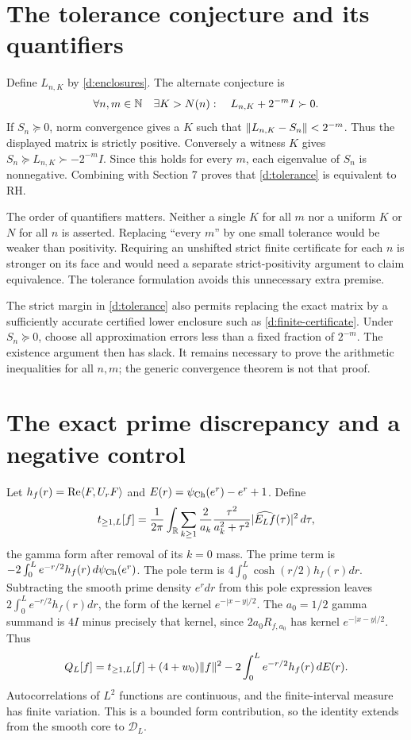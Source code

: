 \section{The tolerance conjecture and its quantifiers}
Define $L_{n,K}$ by \eqref{d:enclosures}. The alternate conjecture is
\begin{equation}\label{d:tolerance}
\forall n,m\in\mathbb N\quad\exists K>N(n):\quad
L_{n,K}+2^{-m}I\succ0.
\end{equation}
If $S_n\succeq0$, norm convergence gives a $K$ such that
$\lVert L_{n,K}-S_n\rVert<2^{-m}$. Thus the displayed matrix is strictly
positive. Conversely a witness $K$ gives
$S_n\succeq L_{n,K}\succ-2^{-m}I$. Since this holds for every $m$,
each eigenvalue of $S_n$ is nonnegative. Combining with Section 7 proves
that \eqref{d:tolerance} is equivalent to RH.

The order of quantifiers matters. Neither a single $K$ for all $m$ nor a
uniform $K$ or $N$ for all $n$ is asserted. Replacing ``every $m$'' by one
small tolerance would be weaker than positivity. Requiring an unshifted
strict finite certificate for each $n$ is stronger on its face and would
need a separate strict-positivity argument to claim equivalence.
The tolerance formulation avoids this unnecessary extra premise.

The strict margin in \eqref{d:tolerance} also permits replacing the exact
matrix by a sufficiently accurate certified lower enclosure such as
\eqref{d:finite-certificate}. Under $S_n\succeq0$, choose all approximation
errors less than a fixed fraction of $2^{-m}$. The existence argument
then has slack. It remains necessary to prove the arithmetic inequalities
for all $n,m$; the generic convergence theorem is not that proof.

\section{The exact prime discrepancy and a negative control}
Let $h_f(r)=\operatorname{Re}\langle F,U_rF\rangle$ and
$E(r)=\psi_{\rm Ch}(e^r)-e^r+1$. Define
\[
t_{\ge1,L}[f]=\frac1{2\pi}\int_\mathbb R
\sum_{k\ge1}\frac2{a_k}\frac{\tau^2}{a_k^2+\tau^2}
|\widehat{E_Lf}(\tau)|^2\,d\tau,
\]
the gamma form after removal of its $k=0$ mass. The prime term is
$-2\int_0^L e^{-r/2}h_f(r)\,d\psi_{\rm Ch}(e^r)$.
The pole term is $4\int_0^L\cosh(r/2)h_f(r)dr$.
Subtracting the smooth prime density $e^rdr$ from this pole expression
leaves $2\int_0^Le^{-r/2}h_f(r)dr$, the form of the kernel
$e^{-|x-y|/2}$. The $a_0=1/2$ gamma summand is $4I$ minus precisely
that kernel, since $2a_0R_{f,a_0}$ has kernel $e^{-|x-y|/2}$.
Thus
\begin{equation}\label{d:discrepancy}
Q_L[f]=t_{\ge1,L}[f]+(4+w_0)\lVert f\rVert^2
-2\int_0^Le^{-r/2}h_f(r)\,dE(r).
\end{equation}
Autocorrelations of $L^2$ functions are continuous, and the finite-interval
measure has finite variation. This is a bounded form contribution, so
the identity extends from the smooth core to $\mathcal D_L$.

